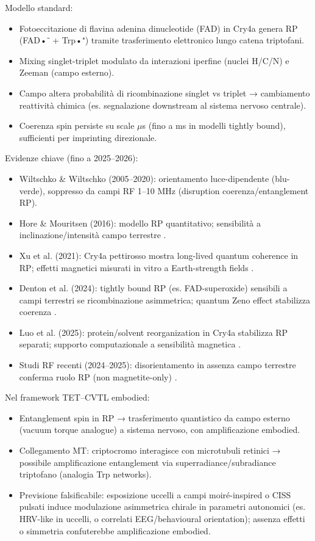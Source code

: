 \documentclass[11pt,a4paper]{article}
\let\oldcite\cite
\renewcommand{\cite}{\protect\oldcite}
\theoremstyle{plain}
\theoremstyle{definition}
\begin{document}
Modello standard:
\begin{itemize}
    \item Fotoeccitazione di flavina adenina dinucleotide (FAD) in Cry4a genera RP (FAD•⁻ + Trp•⁺) tramite trasferimento elettronico lungo catena triptofani.
    \item Mixing singlet-triplet modulato da interazioni iperfine (nuclei H/C/N) e Zeeman (campo esterno).
    \item Campo altera probabilità di ricombinazione singlet vs triplet → cambiamento reattività chimica (es. segnalazione downstream al sistema nervoso centrale).
    \item Coerenza spin persiste su scale $\mu$s (fino a ms in modelli tightly bound), sufficienti per imprinting direzionale.
\end{itemize}

Evidenze chiave (fino a 2025–2026):
\begin{itemize}
    \item Wiltschko \& Wiltschko (2005–2020): orientamento luce-dipendente (blu-verde), soppresso da campi RF 1–10 MHz (disruption coerenza/entanglement RP).
    \item Hore \& Mouritsen (2016): modello RP quantitativo; sensibilità a inclinazione/intensità campo terrestre \cite{Hore2016}.
    \item Xu et al. (2021): Cry4a pettirosso mostra long-lived quantum coherence in RP; effetti magnetici misurati in vitro a Earth-strength fields \cite{Xu2021}.
    \item Denton et al. (2024): tightly bound RP (es. FAD-superoxide) sensibili a campi terrestri se ricombinazione asimmetrica; quantum Zeno effect stabilizza coerenza \cite{Denton2024}.
    \item Luo et al. (2025): protein/solvent reorganization in Cry4a stabilizza RP separati; supporto computazionale a sensibilità magnetica \cite{Luo2025}.
    \item Studi RF recenti (2024–2025): disorientamento in assenza campo terrestre conferma ruolo RP (non magnetite-only) \cite{RoyalSoc2024}.
\end{itemize}

Nel framework TET–CVTL embodied:
\begin{itemize}
    \item Entanglement spin in RP → trasferimento quantistico da campo esterno (vacuum torque analogue) a sistema nervoso, con amplificazione embodied.
    \item Collegamento MT: criptocromo interagisce con microtubuli retinici → possibile amplificazione entanglement via superradiance/subradiance triptofano (analogia Trp networks).
    \item Previsione falsificabile: esposizione uccelli a campi moiré-inspired o CISS pulsati induce modulazione asimmetrica chirale in parametri autonomici (es. HRV-like in uccelli, o correlati EEG/behavioural orientation); assenza effetti o simmetria confuterebbe amplificazione embodied.
\end{itemize}
\end{document}
